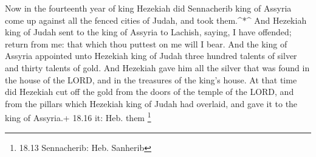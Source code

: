  Now in the fourteenth year of king Hezekiah did
Sennacherib king of Assyria come up against all the fenced cities of
Judah, and took them.\^{}*\^{}  And Hezekiah king of Judah
sent to the king of Assyria to Lachish, saying, I have offended; return
from me: that which thou puttest on me will I bear. And the king of
Assyria appointed unto Hezekiah king of Judah three hundred talents of
silver and thirty talents of gold.  And Hezekiah gave him
all the silver that was found in the house of the LORD, and in the
treasures of the king's house.  At that time did Hezekiah
cut off the gold from the doors of the temple of the LORD, and from the
pillars which Hezekiah king of Judah had overlaid, and gave it to the
king of Assyria.+ 18.16 it: Heb. them \footnote{18.13 Sennacherib: Heb.
  Sanherib}

